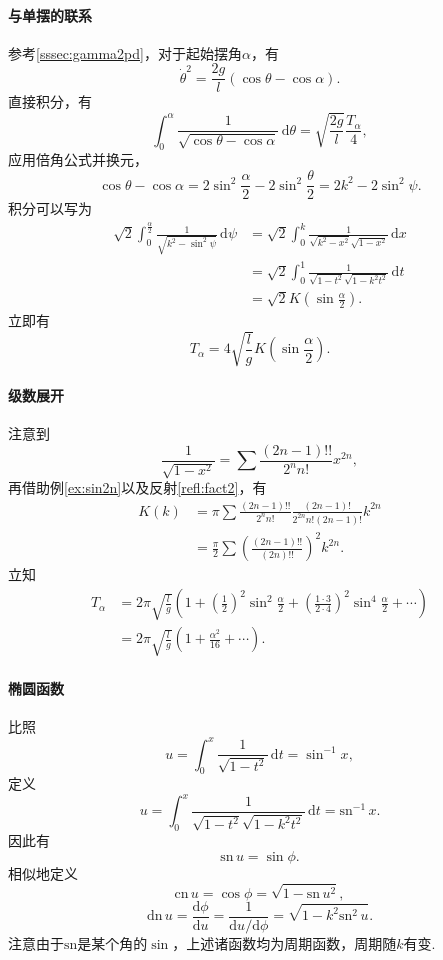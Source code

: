 \documentclass[UTF-8]{ctexart}
\newcommand{\dr}{\mathrm{d}}
\newcommand{\dd}{\mathrm{d}}
\newcommand{\pare}[1]{\left(#1\right)}
\newcommand{\dif}[2]{\frac{\dd #1}{\dd #2}}
\newcommand{\half}{\frac{1}{2}}
\newcommand{\intu}[3]{\int_0^{#1} #2 \, \dr #3}
\newcommand{\sn}{\mathrm{sn}}
\newcommand{\cn}{\mathrm{cn}}
\newcommand{\dn}{\mathrm{dn}}
\newcommand{\rref}[1]{反射\ref{refl:#1}}
\newcommand{\eref}[1]{例\ref{ex:#1}}
\begin{document}
  \paragraph{与单摆的联系}参考\ref{sssec:gamma2pd}，对于起始摆角$\alpha$，有
  \[ \dot{\theta}^2=\frac{2g}{l}\pare{\cos\theta-\cos\alpha}. \]
  直接积分，有
  \[ \intu{\alpha}{\frac{1}{\sqrt{\cos\theta-\cos\alpha}}}{\theta} = \sqrt{\frac{2g}{l}}\frac{T_\alpha}{4}, \]
  应用倍角公式并换元，
  \[ \cos\theta-\cos\alpha = 2\sin^2\frac{\alpha}{2}-2\sin^2\frac{\theta}{2} =  2k^2-2\sin^2\psi. \]
  积分可以写为
  \begin{align*}
    \sqrt{2}\intu{\frac{\alpha}{2}}{\frac{1}{\sqrt{k^2-\sin^2\psi}}}{\psi} &= \sqrt{2}\intu{k}{\frac{1}{\sqrt{k^2-x^2}\sqrt{1-x^2}}}{x}\\
    &= \sqrt{2}\intu{1}{\frac{1}{\sqrt{1-t^2}\sqrt{1-k^2t^2}}}{t}\\
    &= \sqrt{2}K\pare{\sin\frac{\alpha}{2}}.
  \end{align*}
  立即有
  \[ T_\alpha = 4\sqrt{\frac{l}{g}}K\pare{\sin\frac{\alpha}{2}}. \]
  \paragraph{级数展开}注意到
  \[ \frac{1}{\sqrt{1-x^2}} = \sum \frac{\pare{2n-1}!!}{2^n n!}x^{2n}, \]
  再借助\eref{sin2n}以及\rref{fact2}，有
  \begin{align*}
  K\pare{k} &= \pi \sum \frac{\pare{2n-1}!!}{2^n n!}\frac{\pare{2n-1}!}{2^{2n}n!\pare{2n-1}!}k^{2n}\\
  &= \frac{\pi}{2}\sum\pare{\frac{\pare{2n-1}!!}{\pare{2n}!!}}^2k^{2n}.
  \end{align*}
  立知
  \begin{align*}
  T_\alpha &= 2\pi\sqrt{\frac{l}{g}}\pare{1+\pare{\half}^2\sin^2\frac{\alpha}{2}+\pare{\frac{1\cdot 3}{2\cdot 4}}^2\sin^4\frac{\alpha}{2}+\cdots} \\
  &= 2\pi\sqrt{\frac{l}{g}}\pare{1+\frac{\alpha^2}{16}+\cdots} .
  \end{align*}
  \paragraph{椭圆函数}比照
  \[ u = \intu{x}{\frac{1}{\sqrt{1-t^2}}}{t} = \sin^{-1}x, \]
  定义
  \[ u = \intu{x}{\frac{1}{\sqrt{1-t^2}\sqrt{1-k^2t^2}}}{t} = \sn^{-1}\,x. \]
  因此有
  \[ \sn\, u = \sin \phi. \]
  相似地定义
  \[ \cn\, u = \cos \phi = \sqrt{1-\sn\, u^2}, \]
  \[ \dn\, u = \dif{\phi}{u} = \frac{1}{\dd u/\dd \phi} = \sqrt{1-k^2\sn^2\,u}. \]
  注意由于$\sn$是某个角的$\sin$，上述诸函数均为周期函数，周期随$k$有变.
\end{document}
